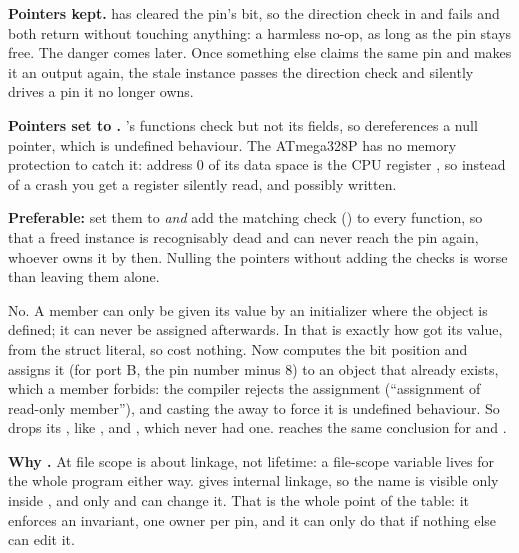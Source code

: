 \textbf{Pointers kept.}  has cleared the pin's  bit, so the direction
check in  and  fails and both return without touching
anything: a harmless no-op, as long as the pin stays free. The danger comes later. Once something
else claims the same pin and makes it an output again, the stale instance passes the direction
check and silently drives a pin it no longer owns.

\textbf{Pointers set to .} 's functions check  but not its
fields, so  dereferences a null pointer, which is undefined behaviour. The
ATmega328P has no memory protection to catch it: address 0 of its data space is the CPU register
, so instead of a crash you get a register silently read, and possibly written.

\textbf{Preferable:} set them to  \emph{and} add the matching check
() to every function, so that a freed instance is recognisably dead and
can never reach the pin again, whoever owns it by then. Nulling the pointers without adding the
checks is worse than leaving them alone.

No. A  member can only be given its value by an initializer where the object is
defined; it can never be assigned afterwards. In  that is exactly how  got
its value, from the struct literal, so  cost nothing. Now  computes
the bit position and assigns it (for port B, the pin number minus 8) to an object that already
exists, which a  member forbids: the compiler rejects the assignment (``assignment of
read-only member''), and casting the  away to force it is undefined behaviour. So
 drops its , like ,  and , which never had
one.  reaches the same conclusion for  and .

\textbf{Why .} At file scope  is about linkage, not lifetime: a
file-scope variable lives for the whole program either way.  gives 
internal linkage, so the name is visible only inside , and only  and
 can change it. That is the whole point of the table: it enforces an invariant,
one owner per pin, and it can only do that if nothing else can edit it.

